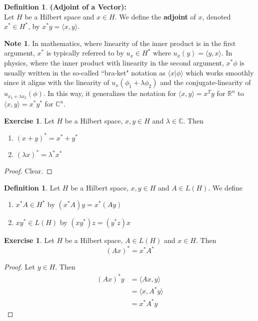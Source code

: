 \documentclass[12pt]{amsart}
\theoremstyle{definition}
\newtheorem{defn}[definition]{Definition}
\newtheorem{note}[definition]{Note}
\newtheorem{ex}[definition]{Exercise}
\newcommand{\lam}{\lambda}
\newcommand{\C}{\mathbb{C}}
\newcommand{\R}{\mathbb{R}}
\renewcommand{\r}{\rangle}
\renewcommand{\l}{\langle}
\begin{document}
\begin{defn}\textbf{(Adjoint of a Vector):} \\
	Let $H$ be a Hilbert space and $x \in H$. We define the \textbf{adjoint} of $x$, denoted $x^* \in H^*$, by $x^* y = \l x, y \r$. 
\end{defn}

\begin{note}
	In mathematics, where linearity of the inner product is in the first argument, $x^{*}$ is typically referred to by $u_{x} \in H^{*} $ where $u_{x}(y) = \l y, x\r$. In physics, where the inner product with linearity in the second argument, $x^{*} \phi$ is usually written in the so-called ``bra-ket" notation as $\l x | \phi \r$ which works smoothly since it aligns with the linearity of $u_{x}(\phi_1 + \lam \phi_2)$ and the conjugate-linearity of $u_{x_1 + \lam x_2}(\phi)$. In this way, it generalizes the notation for $\l x, y\r = x^T y$ for $\R^n$ to $\l x, y\r = x^*y^*$ for $\C^n$. 
\end{note}

\begin{ex}
	Let $H$ be a Hilbert space, $x, y \in H$ and $\lam \in \C$. Then 
	\begin{enumerate}
		\item $(x + y)^* =  x^* + y^*$
		\item $(\lam x)^* = \lam^* x^*$
	\end{enumerate}
\end{ex}

\begin{proof}
	Clear.
\end{proof}

\begin{defn}
	Let $H$ be a Hilbert space, $x, y \in H$ and $A \in L(H)$. We define 
	\begin{enumerate}
		\item $x^* A \in H^*$ by $(x^*A) y = x^*(A y)$
		\item $x y^* \in L(H)$ by $(x y^*) z = (y^*z) x$
	\end{enumerate}
\end{defn}

\begin{ex}
	Let $H$ be a Hilbert space, $A \in L(H)$ and $x \in H$. Then $$(A x)^*= x^*A^*$$
\end{ex}

\begin{proof}
	Let $y \in H$. Then 
	\begin{align*}
		(Ax)^*	y 
		&= \l Ax, y \r \\
		&= \l x, A^* y \r \\
		&= x^*A^* y
	\end{align*}
\end{proof}
\end{document}
